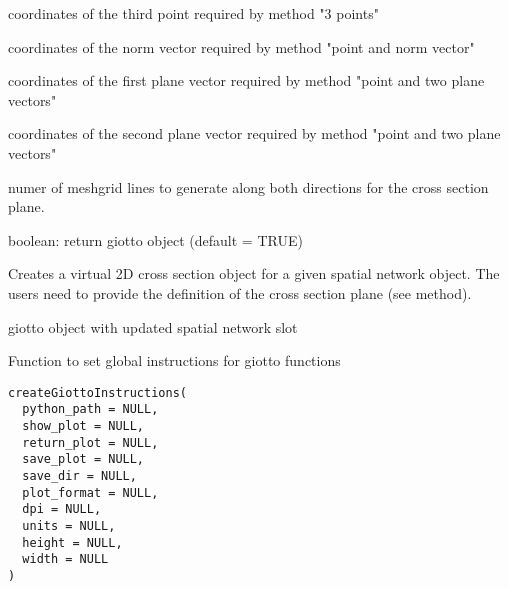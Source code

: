 \documentclass[a4paper]{book}
\begin{document}
\begin{Arguments}
\begin{ldescription}
\item[\code{point3}] coordinates of the third point required by method "3 points"

\item[\code{normVector}] coordinates of the norm vector required by method "point and norm vector"

\item[\code{planeVector1}] coordinates of the first plane vector required by method "point and two plane vectors"

\item[\code{planeVector2}] coordinates of the second plane vector required by method "point and two plane vectors"

\item[\code{mesh\_grid\_n}] numer of meshgrid lines to generate along both directions for the cross section plane.

\item[\code{return\_gobject}] boolean: return giotto object (default = TRUE)
\end{ldescription}
\end{Arguments}
%
\begin{Details}\relax
Creates a virtual 2D cross section object for a given spatial network object. The users need to provide the definition of the cross section plane (see method).
\end{Details}
%
\begin{Value}
giotto object with updated spatial network slot
\end{Value}
%
\begin{Description}\relax
Function to set global instructions for giotto functions
\end{Description}
%
\begin{Usage}
\begin{verbatim}
createGiottoInstructions(
  python_path = NULL,
  show_plot = NULL,
  return_plot = NULL,
  save_plot = NULL,
  save_dir = NULL,
  plot_format = NULL,
  dpi = NULL,
  units = NULL,
  height = NULL,
  width = NULL
)
\end{verbatim}
\end{Usage}
%
\end{document}
